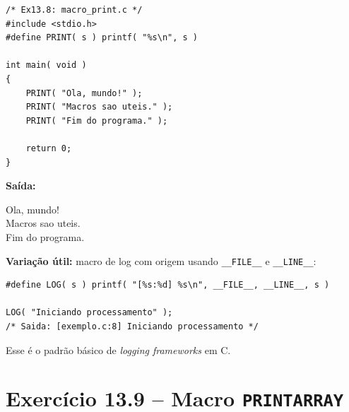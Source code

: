 \documentclass[12pt,a4paper]{article}
\begin{document}
\begin{respostabox}
\begin{lstlisting}
/* Ex13.8: macro_print.c */
#include <stdio.h>
#define PRINT( s ) printf( "%s\n", s )

int main( void )
{
    PRINT( "Ola, mundo!" );
    PRINT( "Macros sao uteis." );
    PRINT( "Fim do programa." );

    return 0;
}
\end{lstlisting}

\textbf{Saída:}
\begin{saida}
Ola, mundo!\\
Macros sao uteis.\\
Fim do programa.
\end{saida}

\textbf{Variação útil:} macro de log com origem usando \texttt{\_\_FILE\_\_} e
\texttt{\_\_LINE\_\_}:
\begin{lstlisting}
#define LOG( s ) printf( "[%s:%d] %s\n", __FILE__, __LINE__, s )

LOG( "Iniciando processamento" );
/* Saida: [exemplo.c:8] Iniciando processamento */
\end{lstlisting}
Esse é o padrão básico de \textit{logging frameworks} em C.
\end{respostabox}

\section{Exercício 13.9 -- Macro \texttt{PRINTARRAY}}
\end{document}
